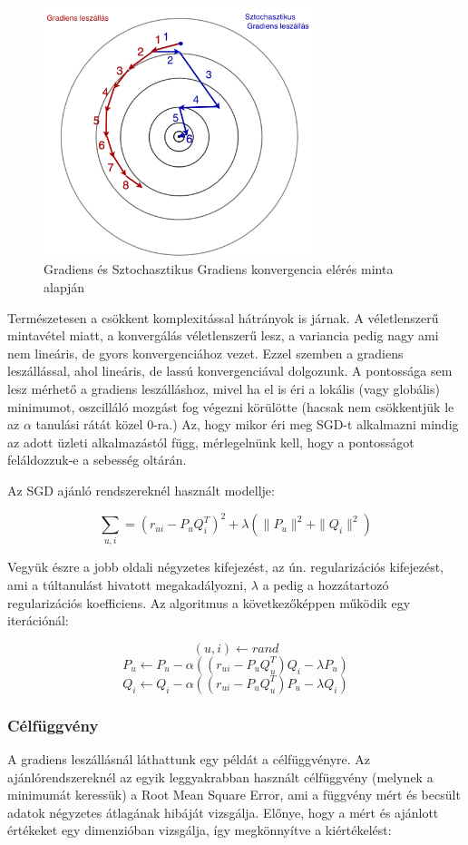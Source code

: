 \documentclass[a4paper,12pt]{article}
\begin{document}
\begin{figure}[H]
\centering
\includegraphics[width=80mm]{img/sgd_bgd.png}
\caption{Gradiens és Sztochasztikus Gradiens konvergencia elérés minta \cite{alfa} alapján \label{sgd_bgd}}
\end{figure}

Természetesen a csökkent komplexitással hátrányok is járnak. A véletlenszerű mintavétel miatt, a konvergálás véletlenszerű lesz, a variancia pedig nagy ami nem lineáris, de gyors konvergenciához vezet. Ezzel szemben a gradiens leszállással, ahol lineáris, de lassú konvergenciával dolgozunk. A pontossága sem lesz mérhető a gradiens leszálláshoz, mivel ha el is éri a lokális (vagy globális) minimumot, oszcilláló mozgást fog végezni körülötte (hacsak nem csökkentjük le az $\alpha$ tanulási rátát közel 0-ra.\cite{bottou})
Az, hogy mikor éri meg SGD-t alkalmazni mindig az adott üzleti alkalmazástól függ, mérlegelnünk kell, hogy a pontosságot feláldozzuk-e a sebesség oltárán. \newline

Az SGD ajánló rendszereknél használt modellje:

\[\sum\limits_{u,i} = (r_{ui}-P_{u}Q_{i}^T)^2 + \lambda (\parallel P_{u}\parallel^2 +\parallel Q_{i}\parallel^2)\]
\[\]

Vegyük észre a jobb oldali négyzetes kifejezést, az ún. regularizációs kifejezést, ami a túltanulást hivatott megakadályozni, $\lambda$ a pedig a hozzátartozó regularizációs koefficiens. Az algoritmus a következőképpen működik egy iterációnál: 

\[(u, i) \leftarrow rand \]
\[P_{u} \leftarrow P_{u} - \alpha((r_{ui}-P_{u}Q_{u}^T)Q_{i} - \lambda P_{u})\]
\[Q_{i} \leftarrow Q_{i} - \alpha((r_{ui}-P_{u}Q_{u}^T)P_{u} - \lambda Q_{i})\]

\subsubsection{Célfüggvény}
A gradiens leszállásnál láthattunk egy példát a célfüggvényre. Az ajánlórendszereknél az egyik leggyakrabban használt célfüggvény (melynek a minimumát keressük) a Root Mean Square Error, ami a függvény mért és becsült adatok négyzetes átlagának hibáját vizsgálja. Előnye, hogy a mért és ajánlott értékeket egy dimenzióban vizsgálja, így megkönnyítve a kiértékelést\cite{vikas}:  
\end{document}
